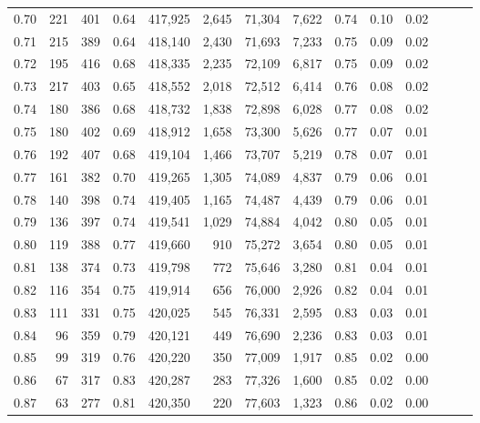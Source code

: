 \begin{tabular}{rrrrrrrrrrrrrr}
0.70 &     221 &    401 &  0.64 &  417,925 &    2,645 &  71,304 &   7,622 &  0.74 &  0.10 &      0.02 \\
0.71 &     215 &    389 &  0.64 &  418,140 &    2,430 &  71,693 &   7,233 &  0.75 &  0.09 &      0.02 \\
0.72 &     195 &    416 &  0.68 &  418,335 &    2,235 &  72,109 &   6,817 &  0.75 &  0.09 &      0.02 \\
0.73 &     217 &    403 &  0.65 &  418,552 &    2,018 &  72,512 &   6,414 &  0.76 &  0.08 &      0.02 \\
0.74 &     180 &    386 &  0.68 &  418,732 &    1,838 &  72,898 &   6,028 &  0.77 &  0.08 &      0.02 \\
0.75 &     180 &    402 &  0.69 &  418,912 &    1,658 &  73,300 &   5,626 &  0.77 &  0.07 &      0.01 \\
0.76 &     192 &    407 &  0.68 &  419,104 &    1,466 &  73,707 &   5,219 &  0.78 &  0.07 &      0.01 \\
0.77 &     161 &    382 &  0.70 &  419,265 &    1,305 &  74,089 &   4,837 &  0.79 &  0.06 &      0.01 \\
0.78 &     140 &    398 &  0.74 &  419,405 &    1,165 &  74,487 &   4,439 &  0.79 &  0.06 &      0.01 \\
0.79 &     136 &    397 &  0.74 &  419,541 &    1,029 &  74,884 &   4,042 &  0.80 &  0.05 &      0.01 \\
0.80 &     119 &    388 &  0.77 &  419,660 &      910 &  75,272 &   3,654 &  0.80 &  0.05 &      0.01 \\
0.81 &     138 &    374 &  0.73 &  419,798 &      772 &  75,646 &   3,280 &  0.81 &  0.04 &      0.01 \\
0.82 &     116 &    354 &  0.75 &  419,914 &      656 &  76,000 &   2,926 &  0.82 &  0.04 &      0.01 \\
0.83 &     111 &    331 &  0.75 &  420,025 &      545 &  76,331 &   2,595 &  0.83 &  0.03 &      0.01 \\
0.84 &      96 &    359 &  0.79 &  420,121 &      449 &  76,690 &   2,236 &  0.83 &  0.03 &      0.01 \\
0.85 &      99 &    319 &  0.76 &  420,220 &      350 &  77,009 &   1,917 &  0.85 &  0.02 &      0.00 \\
0.86 &      67 &    317 &  0.83 &  420,287 &      283 &  77,326 &   1,600 &  0.85 &  0.02 &      0.00 \\
0.87 &      63 &    277 &  0.81 &  420,350 &      220 &  77,603 &   1,323 &  0.86 &  0.02 &      0.00 \\

\end{tabular}

